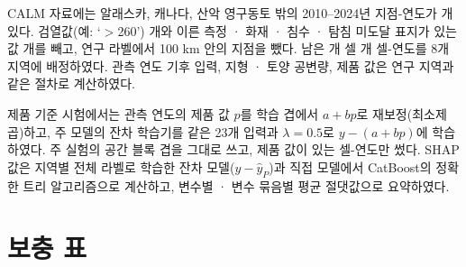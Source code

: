 \documentclass[pdflatex,sn-nature]{sn-jnl}
\begin{document}
CALM 자료\cite{Streletskiy2025}에는 알래스카, 캐나다, 산악 영구동토 밖의 2010--2024년 지점-연도가 \nextRawSy{}개 있다. 검열값(예: `$>$260') \nextCens{}개와 이른 측정 · 화재 · 침수 · 탐침 미도달 표지가 있는 값 \nextQcRm{}개를 빼고, 연구 라벨에서 100 km 안의 지점을 뺐다. 남은 \nextcells{}개 셀 \nextcy{}개 셀-연도를 8개 지역에 배정하였다. 관측 연도 기후 입력, 지형 · 토양 공변량, 제품 값은 연구 지역과 같은 절차로 계산하였다.

제품 기준 시험에서는 관측 연도의 제품 값 $p$를 학습 겹에서 $a+bp$로 재보정(최소제곱)하고, 주 모델의 잔차 학습기를 같은 23개 입력과 $\lambda=0.5$로 $y-(a+bp)$에 학습하였다. 주 실험의 공간 블록 겹을 그대로 쓰고, 제품 값이 있는 셀-연도만 썼다. SHAP 값\cite{Lundberg2017}은 지역별 전체 라벨로 학습한 잔차 모델($y-\hat{y}_P$)과 직접 모델에서 CatBoost의 정확한 트리 알고리즘으로 계산하고, 변수별 · 변수 묶음별 평균 절댓값으로 요약하였다.

\section{보충 표}
\end{document}
